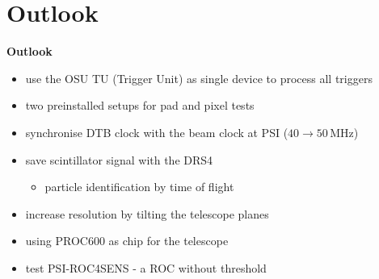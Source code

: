 \documentclass[9pt]{beamer}
\begin{document}
\section{Outlook}
\begin{frame}
	\begin{alertblock}{
		\begin{center}
			\Large{\textbf{Outlook}}
		\end{center}}
	\end{alertblock}
\end{frame}
\begin{frame}
	\begin{itemize}
		\item use the OSU TU (Trigger Unit) as single device to process all triggers
		\item two preinstalled setups for pad and pixel tests
		\item synchronise DTB clock with the beam clock at PSI ($40\rightarrow50$\,MHz)
		\item save scintillator signal with the DRS4
		\begin{itemize}
			\item particle identification by time of flight
		\end{itemize}
		\item increase resolution by tilting the telescope planes
		\item using PROC600 as chip for the telescope
		\item test PSI-ROC4SENS - a ROC without threshold

	\end{itemize}
\end{frame}
\end{document}
